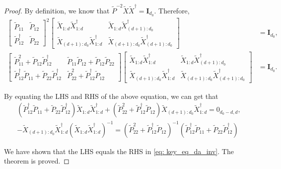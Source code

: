\documentclass{article}
\theoremstyle{plain}
\theoremstyle{definition}
\theoremstyle{remark}
\theoremstyle{remark}
\begin{document}
\begin{proof}
    By definition, we know that $\widetilde{P}^{-2} \widetilde{X} \widetilde{X}^{\dagger}  = \mathbf{I}_{d_0}$. Therefore,
    \begin{align}
      \begin{bmatrix} 
        \widetilde{P}_{11} & \widetilde{P}_{12} \\
        \widetilde{P}_{12}^{\dagger} & \widetilde{P}_{22} 
      \end{bmatrix}^2 
      \begin{bmatrix} 
        \widetilde{X}_{1:d} \widetilde{X}_{1:d}^{\dagger} & \widetilde{X}_{1:d} \widetilde{X}_{(d+1):d_0}^{\dagger} \\ 
        \widetilde{X}_{(d+1):d_0} \widetilde{X}_{1:d}^{\dagger} & \widetilde{X}_{(d+1):d_0} \widetilde{X}_{(d+1):d_0}^{\dagger} 
      \end{bmatrix} &= \mathbf{I}_{d_0}, \\
      \begin{bmatrix} 
        \widetilde{P}_{11}^2 + \widetilde{P}_{12} \widetilde{P}_{12}^{\dagger} & \widetilde{P}_{11}\widetilde{P}_{12} + \widetilde{P}_{12} \widetilde{P}_{22} \\ 
        \widetilde{P}_{12}^{\dagger} \widetilde{P}_{11} + \widetilde{P}_{22} \widetilde{P}_{12}^{\dagger} & \widetilde{P}_{22}^2 + \widetilde{P}_{12}^{\dagger} \widetilde{P}_{12} 
      \end{bmatrix} 
      \begin{bmatrix} 
        \widetilde{X}_{1:d} \widetilde{X}_{1:d}^{\dagger} & \widetilde{X}_{1:d} \widetilde{X}_{(d+1):d_0}^{\dagger} \\ 
        \widetilde{X}_{(d+1):d_0} \widetilde{X}_{1:d}^{\dagger} & \widetilde{X}_{(d+1):d_0} \widetilde{X}_{(d+1):d_0}^{\dagger} 
      \end{bmatrix} &= \mathbf{I}_{d_0}.
    \end{align}

    By equating the LHS and RHS of the above equation, we can get that
    \begin{align}
      (\widetilde{P}_{12}^{\dagger} \widetilde{P}_{11} + \widetilde{P}_{22} \widetilde{P}_{12}^{\dagger}) \widetilde{X}_{1:d} \widetilde{X}_{1:d}^{\dagger} + (\widetilde{P}_{22}^2 + \widetilde{P}_{12}^{\dagger} \widetilde{P}_{12})  \widetilde{X}_{(d+1):d_0} \widetilde{X}_{1:d}^{\dagger} = 0_{d_0-d, d}, \nonumber \\
      -\widetilde{X}_{(d+1):d_0} \widetilde{X}_{1:d}^{\dagger}\left(\widetilde{X}_{1:d} \widetilde{X}_{1:d}^{\dagger}\right)^{-1} = (\widetilde{P}_{22}^2 + \widetilde{P}_{12}^{\dagger} \widetilde{P}_{12})^{-1}(\widetilde{P}_{12}^{\dagger}\widetilde{P}_{11}+\widetilde{P}_{22} \widetilde{P}_{12}^{\dagger})
    \end{align}

    We have shown that the LHS equals the RHS in \autoref{eq: key_eq_da_inv}. The theorem is proved.
  \end{proof}
\end{document}
